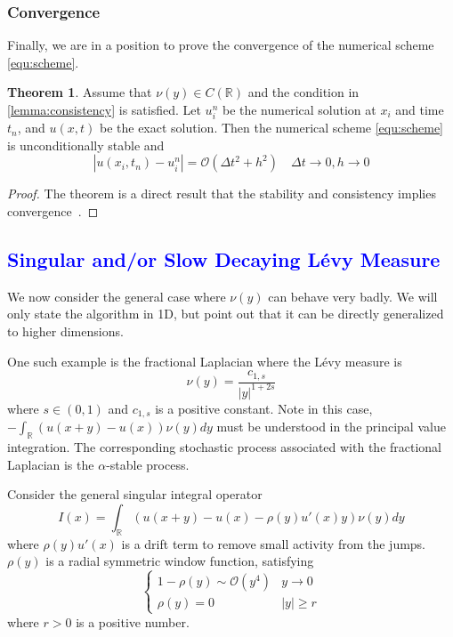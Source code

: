 \documentclass[3p,,preprint,12pt]{elsarticle}
\newcommand{\RR}[0]{\mathbb{R}}
\newcommand{\lib}[1]{\textcolor{blue}{\section{#1}}}
\theoremstyle{definition}
\newtheorem{theorem}{Theorem}
\begin{document}
\subsubsection{Convergence}

Finally, we are in a position to prove the convergence of the numerical scheme \cref{equ:scheme}. 

\begin{theorem}
	Assume that $\nu(y)\in C(\RR)$ and the condition in \cref{lemma:consistency} is satisfied. Let $u_i^n$ be the numerical solution at $x_i$ and time $t_n$, and $u(x, t)$ be the exact solution. Then the numerical scheme \cref{equ:scheme} is unconditionally stable and 
	\begin{equation}
		|u(x_i,t_n)-u_i^n| = \mathcal{O}(\Delta t^2 + h^2) \quad \Delta t \rightarrow 0, h\rightarrow 0
	\end{equation}
\end{theorem}
\begin{proof}
	The theorem is a direct result that the stability and consistency implies convergence~\cite{giles2005convergence}. 
\end{proof}

\lib{Singular and/or Slow Decaying L\'evy Measure}\label{sect:extension}

We now consider the general case where $\nu(y)$ can behave very badly. We will only state the algorithm in 1D, but point out that it can be directly generalized to higher dimensions. 

One such example is the fractional Laplacian where the L\'evy measure is 
\begin{equation}
	\nu(y) = \frac{c_{1,s}}{|y|^{1+2s}}
\end{equation}
where $s\in (0,1)$ and $c_{1,s}$ is a positive constant. Note in this case, $-\int_{\RR}(u(x+y)-u(x))\nu(y)dy$ must be understood in the principal value integration. The corresponding stochastic process associated with the fractional Laplacian is the $\alpha$-stable process. 

Consider the general singular integral operator
\begin{equation}\label{equ:Ix}
	I(x) = \int_{\RR}(u(x+y)-u(x)-\rho(y)u'(x)y)\nu(y)dy
\end{equation}
where $\rho(y)u'(x)$ is a drift term to remove small activity from the jumps. $\rho(y)$ is a radial symmetric window function, satisfying
\begin{equation}\label{equ:rho_condition}
\begin{cases}
	1-\rho(y)\sim \mathcal{O}(y^4)& y\rightarrow 0\\
	\rho(y)=0 & |y|\geq r
\end{cases}
\end{equation}
where $r>0$ is a positive number. 
\end{document}
